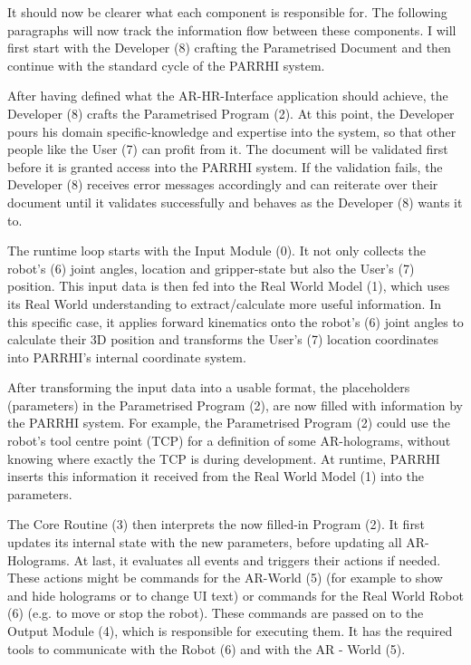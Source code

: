It should now be clearer what each component is responsible for. The following paragraphs will now track the information flow between these components. I will first start with the Developer (8) crafting the Parametrised Document and then continue with the standard cycle of the PARRHI system.

After having defined what the AR-HR-Interface application should achieve, the Developer (8) crafts the Parametrised Program (2). At this point, the Developer pours his domain specific-knowledge and expertise into the system, so that other people like the User (7) can profit from it. The document will be validated first before it is granted access into the PARRHI system. If the validation fails, the Developer (8) receives error messages accordingly and can reiterate over their document until it validates successfully and behaves as the Developer (8) wants it to.

The runtime loop starts with the Input Module (0). It not only collects the robot's (6) joint angles, location and gripper-state but also the User's (7) position. This input data is then fed into the Real World Model (1), which uses its Real World understanding to extract/calculate more useful information. In this specific case, it applies forward kinematics onto the robot's (6) joint angles to calculate their 3D position and transforms the User's (7) location coordinates into PARRHI's internal coordinate system. 

After transforming the input data into a usable format, the placeholders (parameters) in the Parametrised Program (2), are now filled with information by the PARRHI system. For example, the Parametrised Program (2) could use the robot's tool centre point (TCP) for a definition of some AR-holograms, without knowing where exactly the TCP is during development. At runtime, PARRHI inserts this information it received from the Real World Model (1) into the parameters. 

The Core Routine (3) then interprets the now filled-in Program (2). It first updates its internal state with the new parameters, before updating all AR-Holograms. At last, it evaluates all events and triggers their actions if needed. These actions might be commands for the AR-World (5) (for example to show and hide holograms or to change UI text) or commands for the Real World Robot (6) (e.g. to move or stop the robot). These commands are passed on to the Output Module (4), which is responsible for executing them. It has the required tools to communicate with the Robot (6) and with the AR - World (5). 

